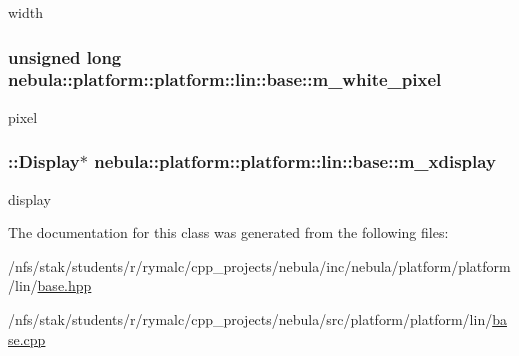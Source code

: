 width \hypertarget{classnebula_1_1platform_1_1platform_1_1lin_1_1base_acc675a81632a7eb163c28a8e8ac9a08a}{
\subsubsection[{m\_\-white\_\-pixel}]{\setlength{\rightskip}{0pt plus 5cm}unsigned long {\bf nebula::platform::platform::lin::base::m\_\-white\_\-pixel}}}
\label{classnebula_1_1platform_1_1platform_1_1lin_1_1base_acc675a81632a7eb163c28a8e8ac9a08a}


pixel \hypertarget{classnebula_1_1platform_1_1platform_1_1lin_1_1base_af2debfefc99156129a9b5f59dc4951e8}{
\subsubsection[{m\_\-xdisplay}]{\setlength{\rightskip}{0pt plus 5cm}::Display$\ast$ {\bf nebula::platform::platform::lin::base::m\_\-xdisplay}}}
\label{classnebula_1_1platform_1_1platform_1_1lin_1_1base_af2debfefc99156129a9b5f59dc4951e8}


display 

The documentation for this class was generated from the following files:\begin{DoxyCompactItemize}
\item 
/nfs/stak/students/r/rymalc/cpp\_\-projects/nebula/inc/nebula/platform/platform/lin/\hyperlink{inc_2nebula_2platform_2platform_2lin_2base_8hpp}{base.hpp}\item 
/nfs/stak/students/r/rymalc/cpp\_\-projects/nebula/src/platform/platform/lin/\hyperlink{src_2platform_2platform_2lin_2base_8cpp}{base.cpp}\end{DoxyCompactItemize}
